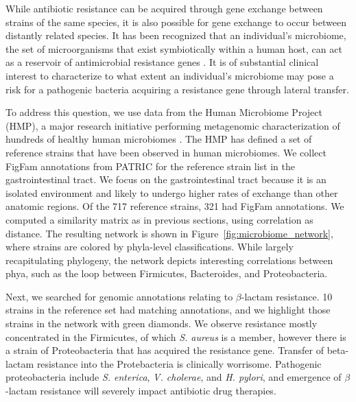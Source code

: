 While antibiotic resistance can be acquired through gene exchange between strains of the same species, it is also possible for gene exchange to occur between distantly related species.
It has been recognized that an individual's microbiome, the set of microorganisms that exist symbiotically within a human host, can act as a reservoir of antimicrobial resistance genes \cite{Sommer:2010uh,Penders:2013wt}.
It is of substantial clinical interest to characterize to what extent an individual's microbiome may pose a risk for a pathogenic bacteria acquiring a resistance gene through lateral transfer.

To address this question, we use data from the Human Microbiome Project (HMP), a major research initiative performing metagenomic characterization of hundreds of healthy human microbiomes \cite{Consortium:2012bm}.
The HMP has defined a set of reference strains that have been observed in human microbiomes.
We collect FigFam annotations from PATRIC for the reference strain list in the gastrointestinal tract.
We focus on the gastrointestinal tract because it is an isolated environment and likely to undergo higher rates of exchange than other anatomic regions.
Of the 717 reference strains, 321 had FigFam annotations.
We computed a similarity matrix as in previous sections, using correlation as distance.
The resulting network is shown in Figure~\ref{fig:microbiome_network}, where strains are colored by phyla-level classifications.
While largely recapitulating phylogeny, the network depicts interesting correlations between phya, such as the loop between Firmicutes, Bacteroides, and Proteobacteria.

Next, we searched for genomic annotations relating to $\beta$-lactam resistance.
10 strains in the reference set had matching annotations, and we highlight those strains in the network with green diamonds.
We observe resistance mostly concentrated in the Firmicutes, of which \emph{S. aureus} is a member, however there is a strain of Proteobacteria that has acquired the resistance gene.
Transfer of beta-lactam resistance into the Protebacteria is clinically worrisome.
Pathogenic proteobacteria include \emph{S. enterica}, \emph{V. cholerae}, and \emph{H. pylori}, and emergence of $\beta$-lactam resistance will severely impact antibiotic drug therapies.

